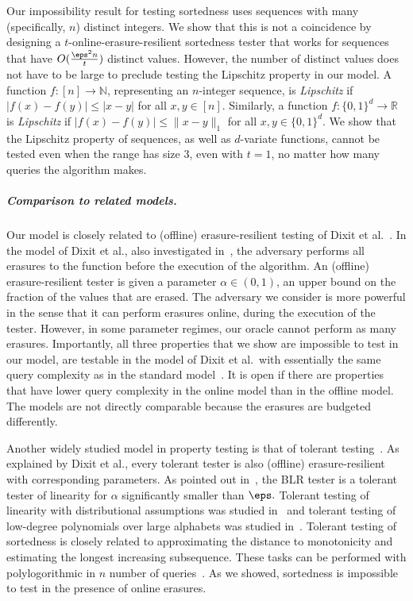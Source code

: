 \documentclass[11pt]{article}
\numberwithin{equation}{section}
\theoremstyle{definition}
\theoremstyle{plain}
\newcommand{\R}{\mathbb R}
\begin{document}
Our impossibility result for testing sortedness uses sequences with many (specifically, $n$) distinct integers. We show that this is not a coincidence by designing a $t$-online-erasure-resilient sortedness tester that works for sequences that have $O(\frac {\eps^2n}{t})$ distinct values. However, the number of distinct values does not have to be large to preclude testing the Lipschitz property in our model. A function $f:[n]\to \mathbb{N}$, representing an $n$-integer sequence, is {\em Lipschitz} 
if $|f(x) - f(y)| \leq |x - y|$ for all $x, y \in [n]$.  Similarly, a function $f \colon \{0, 1\}^d \to \R$ is {\em Lipschitz} if $|f(x) - f(y)| \leq \| x - y \|_1$ for all $x, y \in \{0,1\}^d$. 
We show that the Lipschitz property of sequences, as well as $d$-variate functions, cannot be tested even when the range has size 3, even with $t=1$, no matter how many queries the algorithm makes.


\subparagraph*{Comparison to related models.} Our model is closely related to (offline) erasure-resilient testing of  Dixit et al.~\cite{DixitRTV18}.
In the model of Dixit et al., also investigated in~\cite{RV18,RRV19,BenFLR20,PallavoorRW22,LPRV21,NV20},
 the adversary performs all erasures to the function before the execution of the algorithm. An (offline) erasure-resilient tester is given a parameter $\alpha\in(0,1)$, an upper bound on the fraction of the values that are erased. %
 The adversary we consider is more powerful in the sense that it can perform erasures online, during the execution of the tester. However, in some parameter regimes, our oracle cannot perform as many erasures.
Importantly, all three properties that we show are impossible to test in our model, are testable in the model of Dixit et al.\ with essentially the same query complexity as in the standard model~\cite{DixitRTV18}. 
It is open if there are properties that have lower query complexity in the online model than in the offline model. The models are not directly comparable because the erasures are budgeted differently.

Another widely studied model in property testing is that of tolerant testing~\cite{PRR06}. As explained by Dixit et al., every tolerant tester is also (offline) erasure-resilient with corresponding parameters.
As pointed out in~\cite{PRR06}, the BLR tester is a tolerant tester of linearity for $\alpha$ significantly smaller than $\eps.$ 
Tolerant testing of linearity with distributional assumptions was studied in~\cite{KoppartyS09} and tolerant testing of low-degree polynomials over large alphabets was studied in~\cite{GuruswamiR05}.
%
%
Tolerant testing of sortedness is closely related to approximating the distance to monotonicity and estimating the longest increasing subsequence. These tasks can be performed with polylogorithmic in $n$ number of queries~\cite{PRR06,ACCL07,SaksS17}. As we showed, sortedness is impossible to test in the presence of online erasures. 
\end{document}
